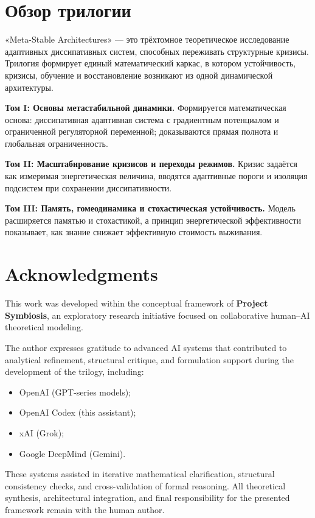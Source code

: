 ﻿\documentclass[12pt,a4paper]{article}
\begin{document}
\section*{Обзор трилогии}
«Meta-Stable Architectures» — это трёхтомное теоретическое исследование адаптивных диссипативных систем, способных переживать структурные кризисы. Трилогия формирует единый математический каркас, в котором устойчивость, кризисы, обучение и восстановление возникают из одной динамической архитектуры.

\textbf{Том I: Основы метастабильной динамики.} Формируется математическая основа: диссипативная адаптивная система с градиентным потенциалом и ограниченной регуляторной переменной; доказываются прямая полнота и глобальная ограниченность.

\textbf{Том II: Масштабирование кризисов и переходы режимов.} Кризис задаётся как измеримая энергетическая величина, вводятся адаптивные пороги и изоляция подсистем при сохранении диссипативности.

\textbf{Том III: Память, гомеодинамика и стохастическая устойчивость.} Модель расширяется памятью и стохастикой, а принцип энергетической эффективности показывает, как знание снижает эффективную стоимость выживания.
\section*{Acknowledgments}
This work was developed within the conceptual framework of \textbf{Project Symbiosis}, an exploratory research initiative focused on collaborative human--AI theoretical modeling.

The author expresses gratitude to advanced AI systems that contributed to analytical refinement, structural critique, and formulation support during the development of the trilogy, including:
\begin{itemize}
    \item OpenAI (GPT-series models);
    \item OpenAI Codex (this assistant);
    \item xAI (Grok);
    \item Google DeepMind (Gemini).
\end{itemize}
These systems assisted in iterative mathematical clarification, structural consistency checks, and cross-validation of formal reasoning. All theoretical synthesis, architectural integration, and final responsibility for the presented framework remain with the human author.
\end{document}
